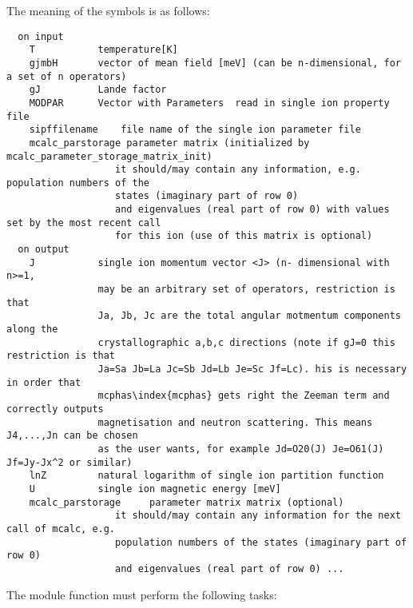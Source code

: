 The meaning of the symbols is as follows:
{\footnotesize
\begin{verbatim}
  on input
    T           temperature[K]
    gjmbH       vector of mean field [meV] (can be n-dimensional, for a set of n operators)
    gJ          Lande factor
    MODPAR      Vector with Parameters  read in single ion property file
    sipffilename    file name of the single ion parameter file
    mcalc_parstorage parameter matrix (initialized by mcalc_parameter_storage_matrix_init)
                   it should/may contain any information, e.g. population numbers of the
				   states (imaginary part of row 0)
                   and eigenvalues (real part of row 0) with values set by the most recent call
                   for this ion (use of this matrix is optional)
  on output    
    J           single ion momentum vector <J> (n- dimensional with n>=1,
                may be an arbitrary set of operators, restriction is that 
                Ja, Jb, Jc are the total angular motmentum components along the
                crystallographic a,b,c directions (note if gJ=0 this restriction is that
                Ja=Sa Jb=La Jc=Sb Jd=Lb Je=Sc Jf=Lc). his is necessary in order that
                mcphas\index{mcphas} gets right the Zeeman term and correctly outputs
				magnetisation and neutron scattering. This means J4,...,Jn can be chosen 
				as the user wants, for example Jd=O20(J) Je=O61(J) Jf=Jy-Jx^2 or similar)
    lnZ         natural logarithm of single ion partition function
    U           single ion magnetic energy [meV]
    mcalc_parstorage     parameter matrix matrix (optional)
                   it should/may contain any information for the next call of mcalc, e.g.
                   population numbers of the states (imaginary part of row 0)
                   and eigenvalues (real part of row 0) ...
\end{verbatim}
}
The module function must perform the following tasks:
